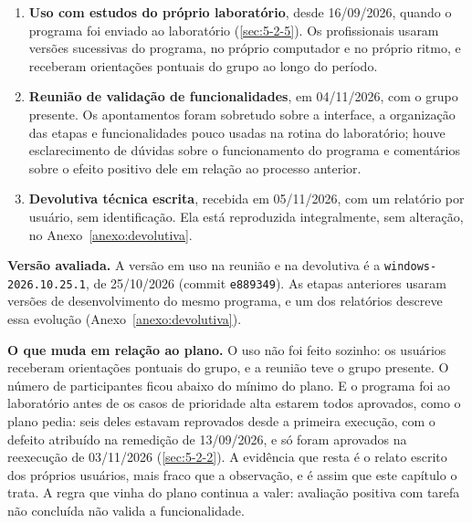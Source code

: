 \begin{enumerate}
\item \textbf{Uso com estudos do próprio laboratório}, desde 16/09/2026, quando o programa foi enviado ao laboratório (\ref{sec:5-2-5}). Os profissionais usaram versões sucessivas do programa, no próprio computador e no próprio ritmo, e receberam orientações pontuais do grupo ao longo do período.
\item \textbf{Reunião de validação de funcionalidades}, em 04/11/2026, com o grupo presente. Os apontamentos foram sobretudo sobre a interface, a organização das etapas e funcionalidades pouco usadas na rotina do laboratório; houve esclarecimento de dúvidas sobre o funcionamento do programa e comentários sobre o efeito positivo dele em relação ao processo anterior.
\item \textbf{Devolutiva técnica escrita}, recebida em 05/11/2026, com um relatório por usuário, sem identificação. Ela está reproduzida integralmente, sem alteração, no Anexo~\ref{anexo:devolutiva}.
\end{enumerate}


\textbf{Versão avaliada.} A versão em uso na reunião e na devolutiva é a \texttt{windows-\allowbreak{}2026.\allowbreak{}10.\allowbreak{}25.\allowbreak{}1}, de 25/10/2026 (commit \texttt{e889349}). As etapas anteriores usaram versões de desenvolvimento do mesmo programa, e um dos relatórios descreve essa evolução (Anexo~\ref{anexo:devolutiva}).


\textbf{O que muda em relação ao plano.} O uso não foi feito sozinho: os usuários receberam orientações pontuais do grupo, e a reunião teve o grupo presente. O número de participantes ficou abaixo do mínimo do plano. E o programa foi ao laboratório antes de os casos de prioridade alta estarem todos aprovados, como o plano pedia: seis deles estavam reprovados desde a primeira execução, com o defeito atribuído na remedição de 13/09/2026, e só foram aprovados na reexecução de 03/11/2026 (\ref{sec:5-2-2}). A evidência que resta é o relato escrito dos próprios usuários, mais fraco que a observação, e é assim que este capítulo o trata. A regra que vinha do plano continua a valer: avaliação positiva com tarefa não concluída não valida a funcionalidade.

